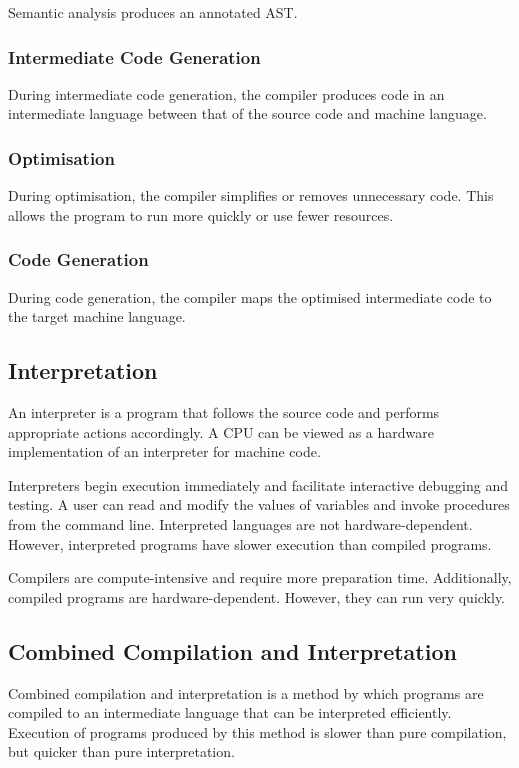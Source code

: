 Semantic analysis produces an annotated AST.

\subsubsection{Intermediate Code Generation}

During intermediate code generation, the compiler produces code in an intermediate language between that of the source code and machine language.

\subsubsection{Optimisation}

During optimisation, the compiler simplifies or removes unnecessary code.
This allows the program to run more quickly or use fewer resources.

\subsubsection{Code Generation}

During code generation, the compiler maps the optimised intermediate code to the target machine language.

\subsection{Interpretation}

An interpreter is a program that follows the source code and performs appropriate actions accordingly.
A CPU can be viewed as a hardware implementation of an interpreter for machine code.

Interpreters begin execution immediately and facilitate interactive debugging and testing.
A user can read and modify the values of variables and invoke procedures from the command line.
Interpreted languages are not hardware-dependent.
However, interpreted programs have slower execution than compiled programs.

Compilers are compute-intensive and require more preparation time.
Additionally, compiled programs are hardware-dependent.
However, they can run very quickly.

\subsection{Combined Compilation and Interpretation}

Combined compilation and interpretation is a method by which programs are compiled to an intermediate language that can be interpreted efficiently.
Execution of programs produced by this method is slower than pure compilation, but quicker than pure interpretation.

